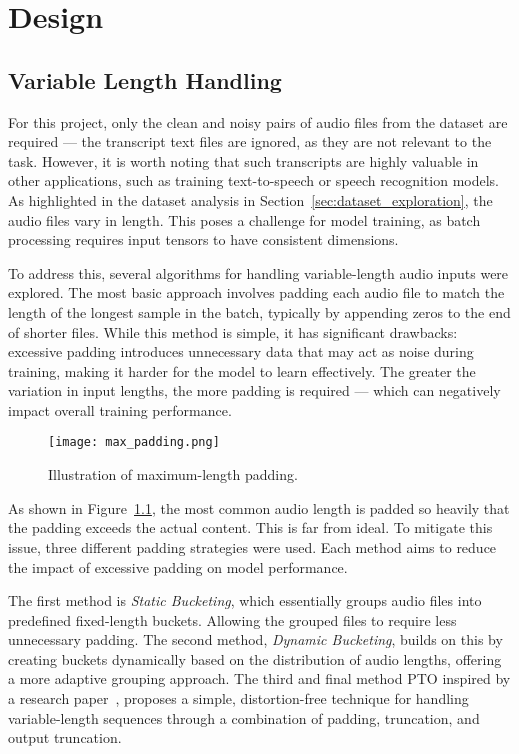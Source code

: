 \graphicspath{{content/chapters/5_design/figures/}}
\chapter{Design}
\label{chp:design}

\section{Variable Length Handling}
\label{sec:variable_length_handling}

For this project, only the clean and noisy pairs of audio files from the dataset are required — the transcript text files are ignored, as they are not relevant to the task. However, it is worth noting that such transcripts are highly valuable in other applications, such as training text-to-speech or speech recognition models. As highlighted in the dataset analysis in Section~\ref{sec:dataset_exploration}, the audio files vary in length. This poses a challenge for model training, as batch processing requires input tensors to have consistent dimensions.

To address this, several algorithms for handling variable-length audio inputs were explored. The most basic approach involves padding each audio file to match the length of the longest sample in the batch, typically by appending zeros to the end of shorter files. While this method is simple, it has significant drawbacks: excessive padding introduces unnecessary data that may act as noise during training, making it harder for the model to learn effectively. The greater the variation in input lengths, the more padding is required — which can negatively impact overall training performance.

\begin{figure}[h]
    \centering
    \texttt{[image: max\_padding.png]}
    \caption{\label{fig:max_padding}Illustration of maximum-length padding.}
\end{figure}

As shown in Figure~\ref{fig:max_padding}, the most common audio length is padded so heavily that the padding exceeds the actual content. This is far from ideal. To mitigate this issue, three different padding strategies were used. Each method aims to reduce the impact of excessive padding on model performance.

The first method is \textit{Static Bucketing}, which essentially groups audio files into predefined fixed-length buckets. Allowing the grouped files to require less unnecessary padding. The second method, \textit{Dynamic Bucketing}, builds on this by creating buckets dynamically based on the distribution of audio lengths, offering a more adaptive grouping approach. The third and final method PTO inspired by a research paper~\cite{yoon2020pto}, proposes a simple, distortion-free technique for handling variable-length sequences through a combination of padding, truncation, and output truncation.

